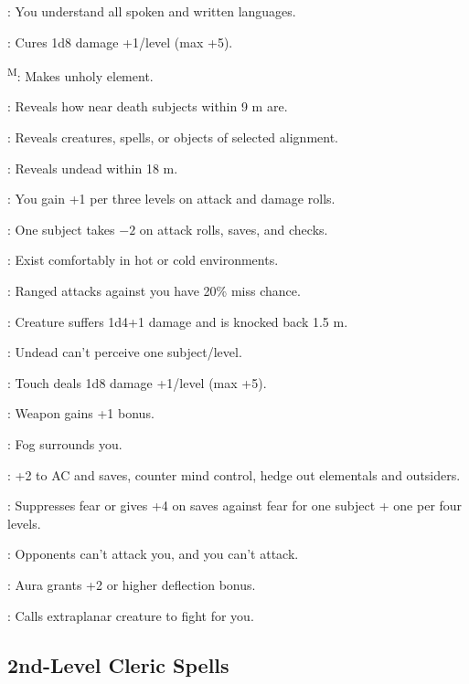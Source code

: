 : You understand all spoken and written languages.

: Cures 1d8 damage +1/level (max +5).

\textsuperscript{M}: Makes unholy element. %

: Reveals how near death subjects within 9 m are.

: Reveals creatures, spells, or objects of selected alignment.

: Reveals undead within 18 m.

: You gain +1 per three levels on attack and damage rolls.

: One subject takes $-2$ on attack rolls, saves, and checks.

: Exist comfortably in hot or cold environments.

: Ranged attacks against you have 20\% miss chance.

: Creature suffers 1d4+1 damage and is knocked back 1.5 m. %

: Undead can't perceive one subject/level.

: Touch deals 1d8 damage +1/level (max +5).


: Weapon gains +1 bonus.

: Fog surrounds you.

: +2 to AC and saves, counter mind control, hedge out elementals and outsiders.

: Suppresses fear or gives +4 on saves against fear for one subject + one per four levels.

: Opponents can't attack you, and you can't attack.

: Aura grants +2 or higher deflection bonus.

: Calls extraplanar creature to fight for you.



\subsection{2nd-Level Cleric Spells}

